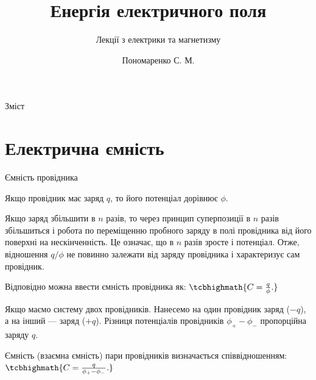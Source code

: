 \documentclass[onlytextwidth]{beamer}
\title[Лекції електрики та магнетизму]{\huge\bfseries Енергія електричного поля}
\subtitle{Лекції з електрики та магнетизму}
\author{Пономаренко С. М.}
\date{}
\begin{document}
\begin{frame}[plain]
	\maketitle
\end{frame}

\begin{frame}{Зміст}{}
	\tableofcontents
\end{frame}



\section{Електрична ємність}

\begin{frame}{Ємність провідника}{}\small
	\begin{block}{}\justifying
		Якщо провідник має заряд $q$, то його потенціал дорівнює $\phi$.

		\medskip

		Якщо заряд збільшити в $n$ разів, то через принцип суперпозиції в $n$ разів збільшиться і
		робота по переміщенню пробного заряду в полі провідника від його поверхні на нескінченність. Це
		означає, що в $n$ разів зросте і потенціал. Отже, відношення $q/\phi$ не повинно залежати від
		заряду провідника і характеризує сам провідник.

		\medskip

		Відповідно можна ввести \alert{ємність провідника} як: $\tcbhighmath{C= \frac{q}{\phi}.}$
	\end{block}

	\begin{block}{}\justifying
		Якщо маємо систему двох провідників. Нанесемо на один провідник заряд ($-q$), а на інший --- заряд
		($+q$). Різниця потенціалів провідників $\phi_+ - \phi_-$ пропорційна заряду $q$.

		\bigskip

		Ємність (\alert{взаємна ємність}) пари провідників визначається співвідношенням:
		$\tcbhighmath{C=
				\frac{q}{\phi_+ - \phi_-}.}$
	\end{block}
\end{frame}
\end{document}
